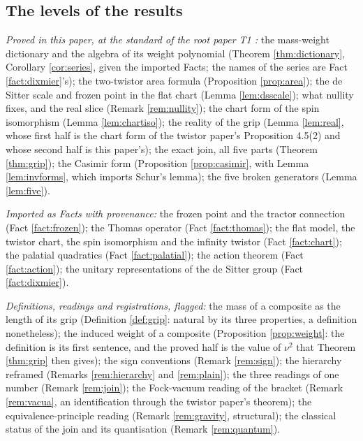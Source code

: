 \documentclass[11pt]{article}
\theoremstyle{definition}
\begin{document}
\subsection*{The levels of the results}\label{sec:scope}

\emph{Proved in this paper, at the standard of the root paper T1 \cite{ButlerT1}:} the mass-weight dictionary and the algebra of its weight polynomial (Theorem \ref{thm:dictionary}, Corollary \ref{cor:series}, given the imported Facts; the names of the series are Fact \ref{fact:dixmier}'s); the two-twistor area formula (Proposition \ref{prop:area}); the de Sitter scale and frozen point in the flat chart (Lemma \ref{lem:dsscale}); what nullity fixes, and the real slice (Remark \ref{rem:nullity}); the chart form of the spin isomorphism (Lemma \ref{lem:chartiso}); the reality of the grip (Lemma \ref{lem:real}, whose first half is the chart form of the twistor paper's Proposition 4.5(2) and whose second half is this paper's); the exact join, all five parts (Theorem \ref{thm:grip}); the Casimir form (Proposition \ref{prop:casimir}, with Lemma \ref{lem:invforms}, which imports Schur's lemma); the five broken generators (Lemma \ref{lem:five}).

\emph{Imported as Facts with provenance:} the frozen point and the tractor connection (Fact \ref{fact:frozen}); the Thomas operator (Fact \ref{fact:thomas}); the flat model, the twistor chart, the spin isomorphism and the infinity twistor (Fact \ref{fact:chart}); the palatial quadratics (Fact \ref{fact:palatial}); the action theorem (Fact \ref{fact:action}); the unitary representations of the de Sitter group (Fact \ref{fact:dixmier}).

\emph{Definitions, readings and registrations, flagged:} the mass of a composite as the length of its grip (Definition \ref{def:grip}: natural by its three properties, a definition nonetheless); the induced weight of a composite (Proposition \ref{prop:weight}: the definition is its first sentence, and the proved half is the value of $\nu^{2}$ that Theorem \ref{thm:grip} then gives); the sign conventions (Remark \ref{rem:sign}); the hierarchy reframed (Remarks \ref{rem:hierarchy} and \ref{rem:plain}); the three readings of one number (Remark \ref{rem:join}); the Fock-vacuum reading of the bracket (Remark \ref{rem:vacua}, an identification through the twistor paper's theorem); the equivalence-principle reading (Remark \ref{rem:gravity}, structural); the classical status of the join and its quantisation (Remark \ref{rem:quantum}).
\end{document}
